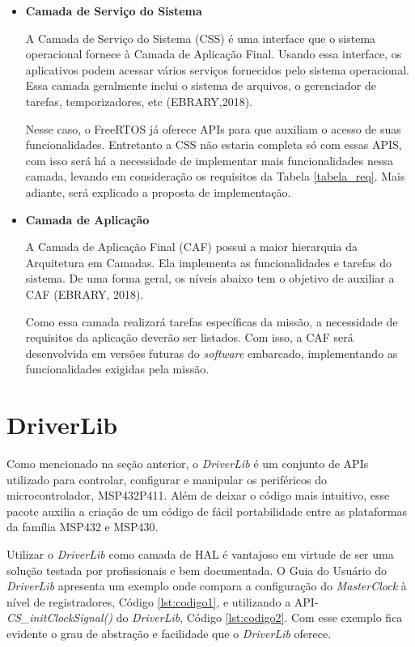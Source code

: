 \begin{itemize}
\item \textbf{Camada de Serviço do Sistema}

A Camada de Serviço do Sistema (CSS) é uma interface que o sistema operacional fornece à Camada de Aplicação Final. Usando essa interface, os aplicativos podem acessar vários serviços fornecidos pelo sistema operacional. Essa camada geralmente inclui o sistema de arquivos, o gerenciador de tarefas, temporizadores, etc (EBRARY,2018).

Nesse caso, o FreeRTOS já oferece APIs para que auxiliam o acesso de suas funcionalidades. Entretanto a CSS não estaria completa só com essas APIS, com isso será há a necessidade de implementar mais funcionalidades nessa camada, levando em consideração os requisitos da Tabela \ref{tabela_req}. Mais adiante, será explicado a proposta de implementação.


\item \textbf{Camada de Aplicação}

A Camada de Aplicação Final (CAF) possui a maior hierarquia da Arquitetura em Camadas. Ela implementa as funcionalidades e tarefas do sistema. De uma forma geral, os níveis abaixo tem o objetivo de auxiliar a CAF (EBRARY, 2018).

Como essa camada realizará tarefas específicas da missão, a necessidade de requisitos da aplicação deverão ser listados. Com isso, a CAF será desenvolvida em versões futuras do \textit{software} embarcado, implementando as funcionalidades exigidas pela missão.



\end{itemize}

\section{DriverLib}

Como mencionado na seção anterior, o \textit{DriverLib} é um conjunto de APIs utilizado para controlar, configurar e manipular os periféricos do microcontrolador, MSP432P411. Além de deixar o código mais intuitivo, esse pacote auxilia a criação de um código de fácil portabilidade entre as plataformas da família MSP432 e MSP430.

Utilizar o \textit{DriverLib} como camada de HAL é vantajoso em virtude de ser uma solução testada por profissionais e bem documentada. O Guia do Usuário do \textit{DriverLib} apresenta um exemplo onde compara a configuração do \textit{MasterClock} à nível de registradores, Código \ref{lst:codigo1}, e utilizando a API-\textit{CS\_initClockSignal()} do \textit{DriverLib}, Código \ref{lst:codigo2}. Com esse exemplo fica evidente o grau de abstração e facilidade que o \textit{DriverLib} oferece.

